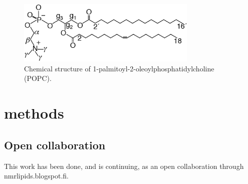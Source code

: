 \documentclass[pre,aps,floatfix,authordate1-4,twocolumn]{revtex4-1}
\begin{document}
  \begin{figure}[]
  \centering
  \includegraphics[width=8.6cm]{POPCstructure.eps}

  \caption{\label{POPCstructure}
    Chemical structure of  1-palmitoyl-2-oleoylphosphatidylcholine (POPC).}
  
\end{figure}

\section{methods}

\subsection{Open collaboration}

This work has been done, and is continuing, as an open collaboration through nmrlipids.blogspot.fi.
\end{document}
